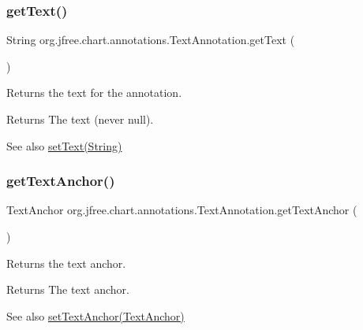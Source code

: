\subsubsection{\texorpdfstring{get\+Text()}{getText()}}
{\footnotesize\ttfamily String org.\+jfree.\+chart.\+annotations.\+Text\+Annotation.\+get\+Text (\begin{DoxyParamCaption}{ }\end{DoxyParamCaption})}

Returns the text for the annotation.

\begin{DoxyReturn}{Returns}
The text (never {\ttfamily null}).
\end{DoxyReturn}
\begin{DoxySeeAlso}{See also}
\mbox{\hyperlink{classorg_1_1jfree_1_1chart_1_1annotations_1_1_text_annotation_a5f98bba3af3dff49aec055bea1737951}{set\+Text(\+String)}} 
\end{DoxySeeAlso}
\mbox{\label{classorg_1_1jfree_1_1chart_1_1annotations_1_1_text_annotation_a12fccb5d729ac02e696948e7bf0c1c3e}} 
\subsubsection{\texorpdfstring{get\+Text\+Anchor()}{getTextAnchor()}}
{\footnotesize\ttfamily Text\+Anchor org.\+jfree.\+chart.\+annotations.\+Text\+Annotation.\+get\+Text\+Anchor (\begin{DoxyParamCaption}{ }\end{DoxyParamCaption})}

Returns the text anchor.

\begin{DoxyReturn}{Returns}
The text anchor.
\end{DoxyReturn}
\begin{DoxySeeAlso}{See also}
\mbox{\hyperlink{classorg_1_1jfree_1_1chart_1_1annotations_1_1_text_annotation_a8a4d5edc3f5f6b8fecaa450f4b56c087}{set\+Text\+Anchor(\+Text\+Anchor)}} 
\end{DoxySeeAlso}
\mbox{\label{classorg_1_1jfree_1_1chart_1_1annotations_1_1_text_annotation_a18a9671a3ab06e93a14e9502c912d389}} 
